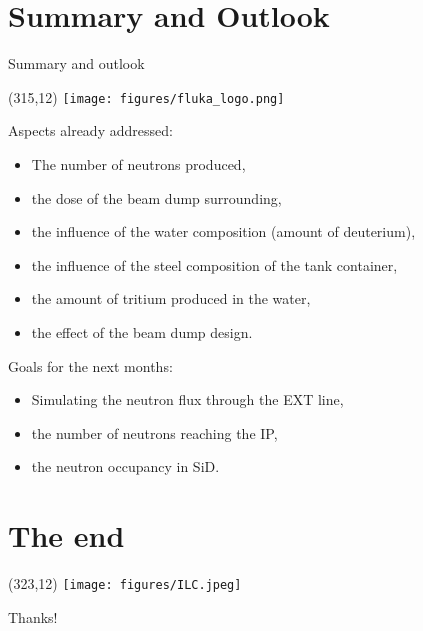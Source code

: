 \documentclass[xcolor={dvipsnames}]{beamer}
\newcommand{\ilclogo}{
  \setlength{\TPHorizModule}{1pt}
  \setlength{\TPVertModule}{1pt}
  \begin{textblock}{1}(323,12)
   \texttt{[image: figures/ILC.jpeg]}
  \end{textblock}
}
\newcommand{\flukalogo}{
  \setlength{\TPHorizModule}{1pt}
  \setlength{\TPVertModule}{1pt}
  \begin{textblock}{1}(315,12)
   \texttt{[image: figures/fluka\_logo.png]}
  \end{textblock}
}
\begin{document}
\section{Summary and Outlook}
\begin{frame}{Summary and outlook}
 \flukalogo
 Aspects already addressed:
\begin{itemize}
 \item The number of neutrons produced,
 \item the dose of the beam dump surrounding,
 \item the influence of the water composition (amount of deuterium),
 \item the influence of the steel composition of the tank container,
 \item the amount of tritium produced in the water,
 \item the effect of the beam dump design.
\end{itemize}
\vspace*{0.2cm}
 Goals for the next months:
\begin{itemize}
 \item Simulating the neutron flux through the EXT line,
 \item the number of neutrons reaching the IP,
 \item the neutron occupancy in SiD.
\end{itemize}
\end{frame}


\section*{The end}
{
\begin{frame}
\ilclogo
\begin{center}
\textcolor{RubineRed}{
	\LARGE Thanks!\\
}
\end{center}
\end{frame}
}
\end{document}
